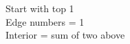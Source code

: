 \documentclass[preview]{standalone}
\begin{document}
Start with top 1\\Edge numbers = 1\\Interior = sum of two above\\
\end{document}
